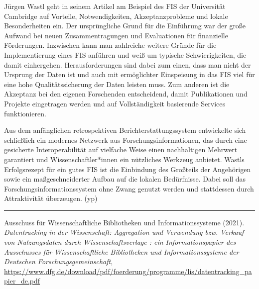 \documentclass[a4paper,
fontsize=11pt,
oneside,
numbers=noperiodatend,
parskip=half-,
bibliography=totoc,
final
]{scrartcl}
\begin{document}
Jürgen Wastl geht in seinem Artikel am Beispiel des FIS der Universität
Cambridge auf Vorteile, Notwendigkeiten, Akzeptanzprobleme und lokale
Besonderheiten ein. Der ursprüngliche Grund für die Einführung war der
große Aufwand bei neuen Zusammentragungen und Evaluationen für
finanzielle Förderungen. Inzwischen kann man zahlreiche weitere Gründe
für die Implementierung eines FIS anführen und weiß um typische
Schwierigkeiten, die damit einhergehen. Herausforderungen sind dabei zum
einen, dass man nicht der Ursprung der Daten ist und auch mit
ermöglichter Einspeisung in das FIS viel für eine hohe
Qualitätssicherung der Daten leisten muss. Zum anderen ist die Akzeptanz
bei den eigenen Forschenden entscheidend, damit Publikationen und
Projekte eingetragen werden und auf Vollständigkeit basierende Services
funktionieren.

Aus dem anfänglichen retrospektiven Berichterstattungssystem entwickelte
sich schließlich ein modernes Netzwerk aus Forschungsinformationen, das
durch eine gesicherte Interoperabilität auf vielfache Weise einen
nachhaltigen Mehrwert garantiert und Wissenschaftler*innen ein
nützliches Werkzeug anbietet. Wastls Erfolgsrezept für ein gutes FIS ist
die Einbindung des Großteils der Angehörigen sowie ein maßgeschneiderter
Aufbau auf die lokalen Bedürfnisse. Dabei soll das
Forschungsinformationssystem ohne Zwang genutzt werden und stattdessen
durch Attraktivität überzeugen. (yp)

\begin{center}\rule{0.5\linewidth}{0.5pt}\end{center}

Ausschuss für Wissenschaftliche Bibliotheken und Informationssysteme
(2021). \emph{Datentracking in der Wissenschaft: Aggregation und
Verwendung bzw. Verkauf von Nutzungsdaten durch Wissenschaftsverlage :
ein Informationspapier des Ausschusses für Wissenschaftliche
Bibliotheken und Informationssysteme der Deutschen
Forschungsgemeinschaft},
\url{https://www.dfg.de/download/pdf/foerderung/programme/lis/datentracking_papier_de.pdf}
\end{document}
